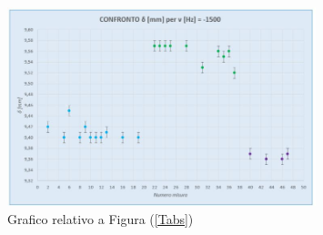 \documentclass{article}
\begin{document}
\begin{figure}[h]
    \centering
    \includegraphics[width=0.8\textwidth]{Coerenza_G4.JPG}
    \caption{Grafico relativo a Figura (\ref{Tabs})}
    \label{Graf_-1500}
\end{figure}
\end{document}
